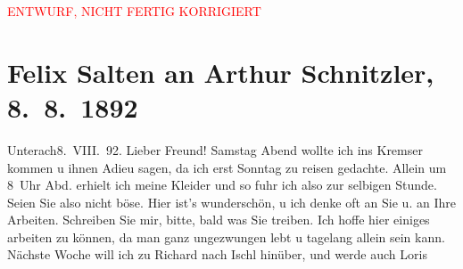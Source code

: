 
\begin{center}
            \textcolor{red}{ENTWURF, NICHT FERTIG KORRIGIERT}
                      \end{center}
            
         
         \renewcommand{\erwaehntePersonen}{Personen: Hermann Bahr, Richard Beer-Hofmann, Marie Glümer, Hugo von Hofmannsthal, Paul Horn, Gustav Schwarzkopf}
         \renewcommand{\erwaehnteOrte}{Orte: Bad Ischl, Berghof, Café Kremser, Deutschland, Unterach am Attersee, Wien}
         \renewcommand{\erwaehnteWerke}{}
               \section[Felix Salten an Arthur Schnitzler, 8. 8. 1892]{ Felix Salten an Arthur Schnitzler, 8. 8. 1892}\nopagebreak{}\rehead{ }\begin{ledgroupsized}[t]{13cm}\normalsize\beginnumbering \toendnotes[C]{\smallbreak\pagebreak[2]} 
\toendnotes[C]{\smallbreak}\pstart
           \raggedleft{}{\pb}Unterach8. VIII. 92.\pend
           \pstart
           Lieber Freund!{ }Samstag{ }Abend wollte ich ins Kremser kommen u
               ihnen Adieu sagen, da ich erst Sonntag zu reisen
               gedachte. Allein um 8 Uhr Abd. erhielt ich meine Kleider und so fuhr ich
               also zur selbigen Stunde. Seien Sie also nicht böse. Hier ist’s wunderschön, u ich
               denke oft an Sie u. an Ihre Arbeiten. Schreiben Sie mir, bitte, bald was Sie
               treiben.\pend
           \pstart
           {\pb}Ich hoffe hier einiges arbeiten zu können,
               da man ganz ungezwungen lebt u tagelang allein sein kann. Nächste Woche will ich zu
                  Richard nach Ischl hinüber, und werde auch Loris

\end{ledgroupsized}
